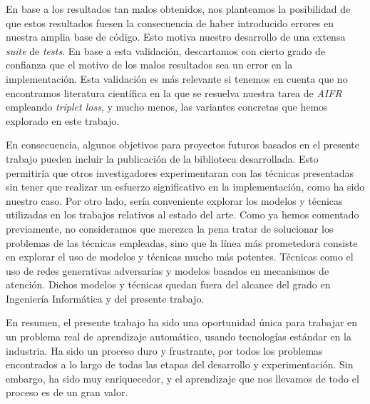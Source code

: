 En base a los resultados tan malos obtenidos, nos planteamos la posibilidad de que estos resultados fuesen la consecuencia de haber introducido errores en nuestra amplia base de código. Esto motiva nuestro desarrollo de una extensa \textit{suite} de \textit{tests}. En base a esta validación, descartamos con cierto grado de confianza que el motivo de los malos resultados sea un error en la implementación. Esta validación es más relevante si tenemos en cuenta que no encontramos literatura científica en la que se resuelva nuestra tarea de \textit{AIFR} empleando \textit{triplet loss}, y mucho menos, las variantes concretas que hemos explorado en este trabajo.

En consecuencia, algunos objetivos para proyectos futuros basados en el presente trabajo pueden incluir la publicación de la biblioteca desarrollada. Esto permitiría que otros investigadores experimentaran con las técnicas presentadas sin tener que realizar un esfuerzo significativo en la implementación, como ha sido nuestro caso. Por otro lado, sería conveniente explorar los modelos y técnicas utilizadas en los trabajos relativos al estado del arte. Como ya hemos comentado previamente, no consideramos que merezca la pena tratar de solucionar los problemas de las técnicas empleadas, sino que la línea más prometedora consiste en explorar el uso de modelos y técnicas mucho más potentes. Técnicas como el uso de redes generativas adversarias y modelos basados en mecanismos de atención. Dichos modelos y técnicas quedan fuera del alcance del grado en Ingeniería Informática y del presente trabajo.

En resumen, el presente trabajo ha sido una oportunidad única para trabajar en un problema real de aprendizaje automático, usando tecnologías estándar en la industria. Ha sido un proceso duro y frustrante, por todos los problemas encontrados a lo largo de todas las etapas del desarrollo y experimentación. Sin embargo, ha sido muy enriquecedor, y el aprendizaje que nos llevamos de todo el proceso es de un gran valor.
